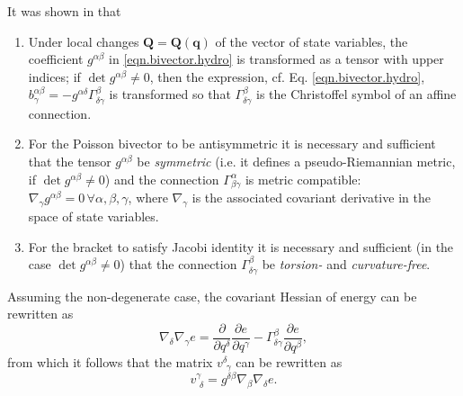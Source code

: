 \documentclass[
10pt, %
a4paper, %
oneside, %
headinclude,footinclude, %
BCOR5mm, %
]{scrartcl}
\newcommand{\qq}{\mathbf{q}}
\newcommand{\QQ}{\mathbf{Q}}
\newcommand{\MP}[1]{{\color{OliveGreen}MP:\ \ #1}}
\newcommand{\IP}[1]{{\color{Red}IP:\ \ #1}}
\newcommand{\VK}[1]{{\color{Cyan}VK:\ \ #1}}
\newcommand{\vab}[2]{v^{#1}_{\ \, #2}}
\begin{document}
It was shown in \cite{Novikov} that
\begin{enumerate}
\item Under local changes $\QQ = \QQ(\qq)$ of the vector of state variables, the coefficient $g^{\alpha\beta}$ in \eqref{eqn.bivector.hydro} is transformed as a tensor with upper indices; if $\det g^{\alpha\beta} \neq 0$, then the expression, cf. Eq. \eqref{eqn.bivector.hydro},
		$b^{\alpha\beta}_\gamma = -g^{\alpha\delta}\Gamma^\beta_{\delta\gamma}$ 
		is transformed so that $\Gamma^\beta_{\delta\gamma}$ is the Christoffel symbol of an affine connection.
\item  For the Poisson bivector to be antisymmetric it is necessary and sufficient that the
	tensor $g^{\alpha\beta}$ be \textit{symmetric} (i.e. it defines a pseudo-Riemannian metric, if $\det g^{\alpha\beta} \neq 0$) and
		the connection $\Gamma^\alpha_{\beta\gamma}$ is metric compatible: $\nabla_\gamma g^{\alpha\beta} = 0\, \forall \alpha,\beta,\gamma$,
		where $\nabla_\gamma$ is the associated 
		covariant derivative in the space of state variables.
	\item  For the bracket to satisfy Jacobi identity it is necessary and sufficient (in the case $\det
	g^{\alpha\beta} \neq 0 $) that the connection $\Gamma^{\beta}_{\delta\gamma}$ be \textit{torsion-} and \textit{curvature-free}.
\end{enumerate}
Assuming the non-degenerate case, the covariant Hessian of energy can be rewritten as 
\begin{equation}
    \nabla_\delta \nabla_\gamma e = \frac{\partial}{\partial q^\delta}\frac{\partial e}{\partial q^\gamma} - \Gamma^\beta_{\delta\gamma}\frac{\partial e}{\partial q^\beta},
\end{equation}
from which it follows that the matrix $\vab{\delta}{\gamma}$ can be rewritten as
\begin{equation}
	\vab{\gamma}{\delta} = g^{\delta\beta}\nabla_\beta \nabla_\delta e.
\end{equation}
\end{document}
